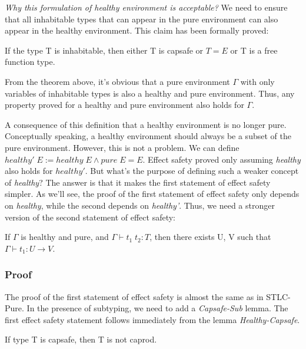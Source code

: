 \emph{Why this formulation of healthy environment is acceptable?} We
need to ensure that all inhabitable types that can
appear in the pure environment can also appear in the healthy
environment. This claim has been formally proved:

\begin{theorem}
  If the type T is inhabitable, then either T is capsafe or $T = E$ or
  T is a free function type.
\end{theorem}

From the theorem above, it's obvious that a pure environment $\Gamma$
with only variables of inhabitable types is also a healthy and pure
environment. Thus, any property proved for a healthy and pure
environment also holds for $\Gamma$.

A consequence of this definition that a healthy environment is no
longer pure. Conceptually speaking, a healthy environment should
always be a subset of the pure environment. However, this is not a
problem. We can define
$healthy' \; E := healthy \; E \wedge pure \; E = E$. Effect safety
proved only assuming \emph{healthy} also holds for $healthy'$. But
what's the purpose of defining such a weaker concept of
\emph{healthy}? The answer is that it makes the first statement of
effect safety simpler. As we'll see, the proof of the first statement
of effect safety only depends on \emph{healthy}, while the second
depends on \emph{healthy'}. Thus, we need a stronger version of the
second statement of effect safety:

\begin{definition}
  If $\Gamma$ is healthy and pure, and $\Gamma \vdash t_1 \; t_2 : T$,
  then there exists U, V such that $\Gamma \vdash t_1 : U \to V$.
\end{definition}


\subsubsection{Proof}

The proof of the first statement of effect safety is almost the same
as in STLC-Pure. In the presence of subtyping, we need to add a
\emph{Capsafe-Sub} lemma.  The first effect safety statement follows
immediately from the lemma \emph{Healthy-Capsafe}.

\begin{lemma}
 If type T is capsafe, then T is not caprod.
\end{lemma}

